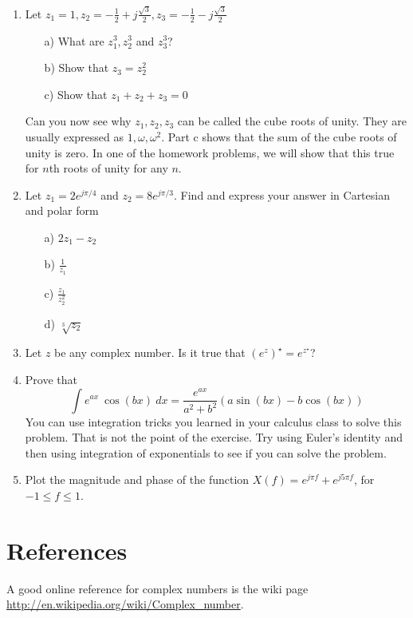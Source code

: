 \begin{enumerate}
\item Let $z_1 = 1, z_2 = -\frac{1}{2} + j \frac{\sqrt{3}}{2}, z_3 = -\frac{1}{2} - j \frac{\sqrt{3}}{2}$
\begin{itemize}
\item[a)] What are $z_1^3, z_2^3$ and $z_3^3$?
\item[b)] Show that $z_3 = z_2^2$
\item[c)] Show that $z_1 + z_2 + z_3 = 0$
\end{itemize}
Can you now see why $z_1,z_2,z_3$ can be called the cube roots of unity. They are usually expressed as $1, \omega, \omega^2$. Part c shows that the sum of the cube roots of unity is zero. In one of the homework problems, we will show that this true for $n$th roots of unity for any $n$.

\item Let $z_1 = 2 e^{j\pi/4}$ and $z_2 = 8 e^{j\pi/3}$. Find and express your answer in Cartesian and polar form
    \begin{itemize}
    \item[a)]$2z_1-z_2$
    \item[b)] $\frac{1}{z_1}$
    \item[c)] $\frac{z_1}{z_2^2}$
    \item[d)] $\sqrt[3]{z_2}$
    \end{itemize}

\item Let $z$ be any complex number. Is it true that $(e^z)^\star
= e^{z^\star}$?


\item Prove that
\[
\int e^{ax} \ \cos(bx) \ dx = \frac{e^{ax}}{a^2+b^2} \left(a \sin(bx) - b \cos(bx) \right)
\]
You can use integration tricks you learned in your calculus class to solve this problem.
That is not the point of the exercise. Try using Euler's identity and then using integration of exponentials to see if you can solve the problem.

\item Plot the magnitude and phase of the function $X(f) = e^{j
\pi f}+e^{j 5 \pi f}$, for $-1 \leq f \leq 1$.

\end{enumerate}

\section{References}
A good online reference for complex numbers is the wiki page
\url{http://en.wikipedia.org/wiki/Complex_number}.

